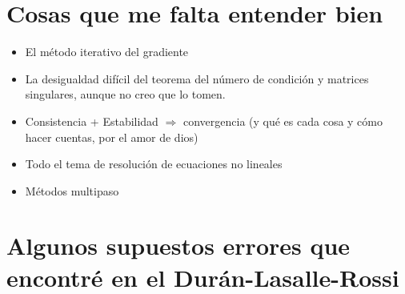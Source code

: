 \documentclass[10pt,a4paper,final]{report}
\begin{document}
{\section{Cosas que me falta entender bien}
\begin{itemize}
	\item El método iterativo del gradiente
	\item La desigualdad difícil del teorema del número de condición y matrices singulares, aunque no creo que lo tomen.
	\item Consistencia + Estabilidad $\Rightarrow$ convergencia (y qué es cada cosa y cómo hacer cuentas, por el amor de dios)
	\item Todo el tema de resolución de ecuaciones no lineales
	\item Métodos multipaso
\end{itemize}



\section{Algunos supuestos errores que encontré en el Durán-Lasalle-Rossi}

}
\end{document}
